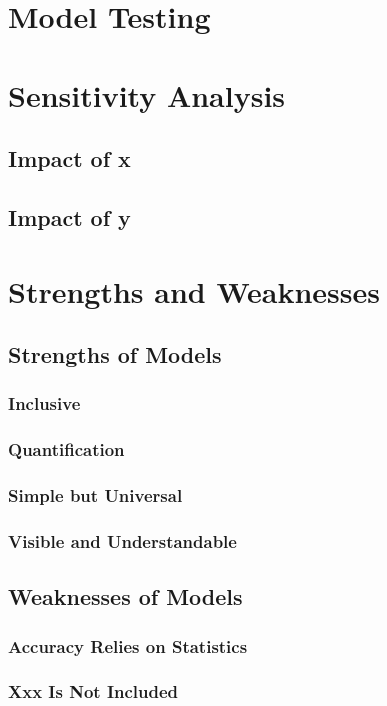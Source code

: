 \documentclass{mcmthesis}
\begin{document}
\section{Model Testing}

\section{Sensitivity Analysis}
\subsection{Impact of x}
\subsection{Impact of y}

\section{Strengths and Weaknesses}
\subsection{Strengths of Models}
\subsubsection{Inclusive}
\subsubsection{Quantification}
\subsubsection{Simple but Universal}
\subsubsection{Visible and Understandable}
\subsection{Weaknesses of Models}
\subsubsection{Accuracy Relies on Statistics}
\subsubsection{Xxx Is Not Included}
\end{document}
